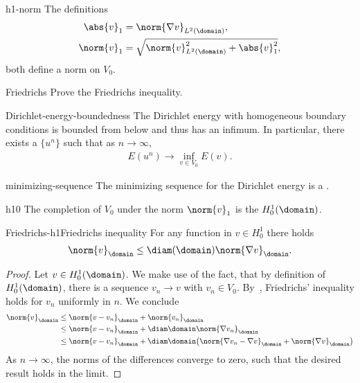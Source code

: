 \begin{Lemma}{h1-norm}
  The definitions
  \begin{gather}
    \begin{split}
      \abs{v}_1 &= \norm{\nabla v}_{L^2(\domain)},\\
      \norm{v}_1 &= \sqrt{\norm{v}^2_{L^2(\domain)}
        + \abs{v}^2_1},
    \end{split}
  \end{gather}
  both define a norm on $V_0$.
\end{Lemma}

\begin{Problem}{Friedrichs}
  Prove the Friedrichs inequality.
\end{Problem}

\begin{Lemma}{Dirichlet-energy-boundedness}
  The Dirichlet energy with homogeneous boundary conditions is bounded
  from below and thus has an infimum. In particular, there exists a
   $\{u^n\}$ such that as $n\to\infty$,
  \begin{gather}
    E(u^n) \to \inf_{v\in V_0} E(v).
  \end{gather}
\end{Lemma}

\begin{Lemma}{minimizing-sequence}
  The minimizing sequence for the Dirichlet energy is a
  .
\end{Lemma}

\begin{Definition}{h10}
  The completion of $V_0$ under the norm $\norm{v}_1$ is the
   $H^1_0(\domain)$.
\end{Definition}

\begin{Lemma*}{Friedrichs-h1}{Friedrichs inequality}
  For any function in $v\in H^1_0$ there holds
  \begin{gather}
      \norm{v}_{\domain}
      \le \diam(\domain) \norm{\nabla v}_{\domain}.
  \end{gather}
\end{Lemma*}

\begin{proof}
  Let $v\in H^1_0(\domain)$.  We make use of the fact, that by
  definition of $H^1_0(\domain)$, there is a sequence $v_n \to v$ with
  $v_n \in V_0$. By~,
  Friedrichs' inequality holds for $v_n$ uniformly in $n$. We conclude
  \begin{align*}
    \norm{v}_\domain &\le \norm{v - v_n}_\domain + \norm{v_n}_\domain \\
    & \le \norm{v - v_n}_\domain + \diam\domain \norm{\nabla v_n}_\domain \\
    & \le \norm{v - v_n}_\domain + \diam\domain
      \bigl(\norm{\nabla v_n - \nabla v}_\domain + \norm{\nabla v}_\domain\bigr)
  \end{align*}
  As $n\to\infty$, the norms of the differences converge to zero, such
  that the desired result holds in the limit.
\end{proof}

